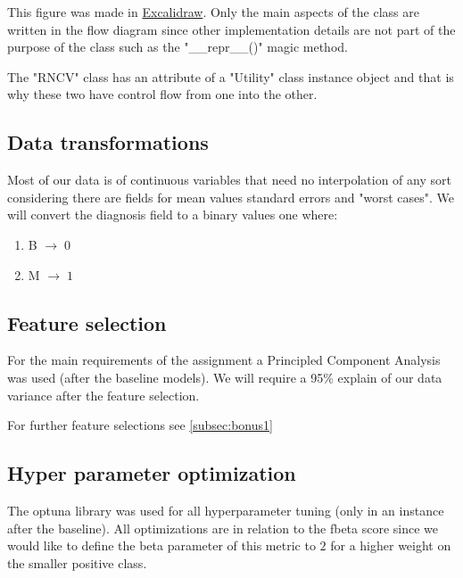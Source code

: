 \documentclass[12pt, a4paper]{article}
\begin{document}
\begin{multicols}{2}

    This figure was made in \href{https://excalidraw.com}{Excalidraw}. Only the main aspects of the class are written in the flow diagram since other implementation details are not part of the purpose of the class such as the "\_\_repr\_\_()" magic method.
    \newline

    The "RNCV" class has an attribute of a "Utility" class instance object and that is why these two have control flow from one into the other.
    \newline

    \subsection{Data transformations} \label{subsec:transforms}

    Most of our data is of continuous variables that need no interpolation of any sort considering there are fields for mean values standard errors and "worst cases". We will convert the diagnosis field to a binary values one where:
    \newline

    \begin{enumerate} \label{enm:casting}
        \item B $\rightarrow \; 0$
        \item M $\rightarrow \; 1$
    \end{enumerate}

    \subsection{Feature selection} \label{subsec:fselect}

    For the main requirements of the assignment a Principled Component Analysis was used (after the baseline models). We will require a 95\% explain of our data variance after the feature selection.
    \newline

    For further feature selections see \ref{subsec:bonus1}
    \newline

    \subsection{Hyper parameter optimization} \label{subsec:optuna}

    The optuna library \cite{noauthor_optuna_nodate} was used for all hyperparameter tuning (only in an instance after the baseline). All optimizations are in relation to the fbeta score since we would like to define the beta parameter of this metric to $2$ for a higher weight on the smaller positive class.
    \newline


\end{multicols}
\end{document}

